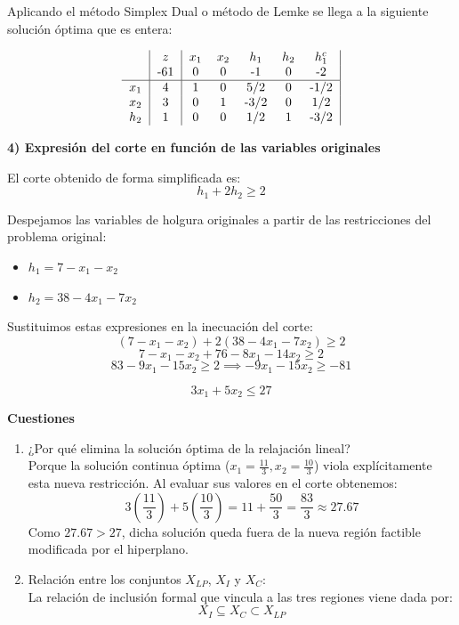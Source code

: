 Aplicando el método Simplex Dual o método de Lemke se llega a la siguiente solución óptima que es entera:

\[
\begin{tabular}{c|c|ccccc|}
 & $z$ & $x_1$ & $x_2$ &  $h_1$ & $h_2$ &$h^c_1$\\ 
 & -61 & 0 & 0 & -1 & 0 & -2 \\ \hline
$x_1$ & 4 & 1 & 0 & 5/2 & 0 & -1/2 \\
$x_2$ & 3 & 0 & 1 & -3/2 & 0 & 1/2 \\
$h_2$ & 1 & 0 & 0 & 1/2 & 1 & -3/2 \\
\end{tabular}
\]



\textbf{4) Expresión del corte en función de las variables originales}

El corte obtenido de forma simplificada es:
\[
h_1 + 2h_2 \ge 2
\]

Despejamos las variables de holgura originales a partir de las restricciones del problema original:
\begin{itemize}
    \item $h_1 = 7 - x_1 - x_2$
    \item $h_2 = 38 - 4x_1 - 7x_2$
\end{itemize}

Sustituimos estas expresiones en la inecuación del corte:
\[
(7 - x_1 - x_2) + 2(38 - 4x_1 - 7x_2) \ge 2
\]
\[
7 - x_1 - x_2 + 76 - 8x_1 - 14x_2 \ge 2
\]
\[
83 - 9x_1 - 15x_2 \ge 2 \implies -9x_1 - 15x_2 \ge -81
\]

\[
{3x_1 + 5x_2 \le 27}
\]

\textbf{Cuestiones}
\begin{enumerate}
    \item[\textbf{a)}] ¿Por qué elimina la solución óptima de la relajación lineal?\\
    Porque la solución continua óptima ($x_1 = \frac{11}{3}, x_2 = \frac{10}{3}$) viola explícitamente esta nueva restricción. Al evaluar sus valores en el corte obtenemos:
    \[
    3\left(\frac{11}{3}\right) + 5\left(\frac{10}{3}\right) = 11 + \frac{50}{3} = \frac{83}{3} \approx 27.67
    \]
    Como $27.67 > 27$, dicha solución queda fuera de la nueva región factible modificada por el hiperplano.

   \item[\textbf{b)}] Relación entre los conjuntos $X_{LP}$, $X_I$ y $X_C$: \\
    La relación de inclusión formal que vincula a las tres regiones viene dada por:
    \[
    X_I \subseteq X_C \subset X_{LP}
    \]
\end{enumerate}